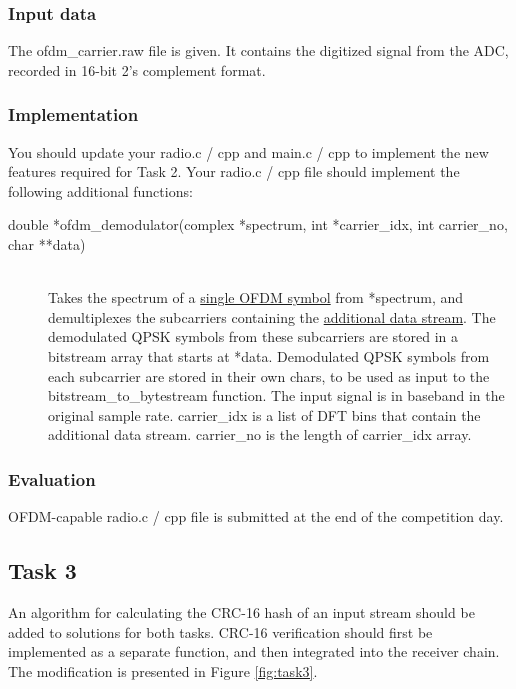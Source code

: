 \documentclass[openany]{book}
\begin{document}
	\subsubsection{Input data}
	The \textsf{ofdm\_carrier.raw} file is given. It contains the digitized 
	signal from the ADC, recorded in 16-bit 2's complement format.
	
	\subsubsection{Implementation}
	You should update your \textsf{radio.c / cpp} and \textsf{main.c / cpp} to 
	implement the new features required for Task 2. Your \textsf{radio.c / cpp} 
	file should implement the following additional functions:
	\begin{description}
		\item[double *ofdm\_demodulator(complex *spectrum, int *carrier\_idx, 
		int carrier\_no, char **data)]
		\,\\ Takes the spectrum of a \underline{single OFDM symbol} from 
		\textsf{*spectrum}, and demultiplexes the subcarriers containing the 
		\underline{additional data stream}. The demodulated QPSK symbols from 
		these subcarriers are stored in a bitstream array that starts at 
		\textsf{*data}. Demodulated QPSK symbols from each subcarrier are 
		stored in their own \textsf{char}s, to be used as input to the 
		\textsf{bitstream\_to\_bytestream} function. The input signal is in 
		baseband in the original sample rate. \textsf{carrier\_idx} is a list 
		of DFT bins that contain the additional data stream. 
		\textsf{carrier\_no} is the length of \textsf{carrier\_idx} array.
	\end{description}
	
	\subsubsection{Evaluation}
	
	OFDM-capable \textsf{radio.c / cpp} file is submitted at the end of the 
	competition day.
	
	\subsection{Task 3}
	An algorithm for calculating the CRC-16 hash of an input stream should be 
	added to solutions for both tasks. CRC-16 verification should first be 
	implemented as a separate function, and then integrated into the receiver 
	chain. The modification is presented in Figure \ref{fig:task3}.
	
\end{document}
